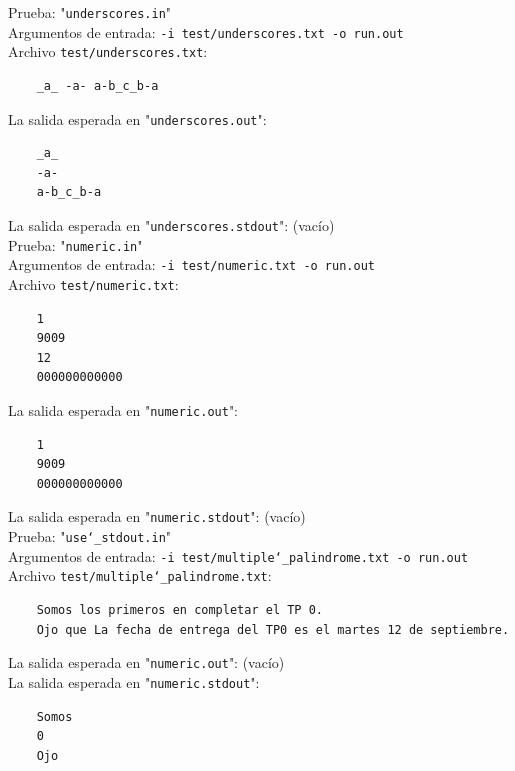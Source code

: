 \documentclass[a4paper,10pt]{article}
\begin{document}
    
    Prueba: "\texttt{underscores.in}" \\
    Argumentos de entrada: \texttt{-i test/underscores.txt -o run.out}\\
    Archivo \texttt{test/underscores.txt}: \\
    \begin{Verbatim}
    _a_ -a- a-b_c_b-a
    \end{Verbatim}
    La salida esperada en "\texttt{underscores.out}":\\
        \begin{Verbatim}
    _a_
    -a-
    a-b_c_b-a
    \end{Verbatim}
    La salida esperada en "\texttt{underscores.stdout}": (vacío)\\
    
        Prueba: "\texttt{numeric.in}" \\
    Argumentos de entrada: \texttt{-i test/numeric.txt -o run.out}\\
    Archivo \texttt{test/numeric.txt}: \\
    \begin{Verbatim}
    1
    9009
    12
    000000000000
    \end{Verbatim}
    La salida esperada en "\texttt{numeric.out}":\\
        \begin{Verbatim}
    1
    9009
    000000000000
    \end{Verbatim}
    La salida esperada en "\texttt{numeric.stdout}": (vacío)\\
    
        Prueba: "\texttt{use\char`_stdout.in}" \\
    Argumentos de entrada: \texttt{-i test/multiple\char`_palindrome.txt -o run.out}\\
    Archivo \texttt{test/multiple\char`_palindrome.txt}: \\
    \begin{Verbatim}
    Somos los primeros en completar el TP 0.
    Ojo que La fecha de entrega del TP0 es el martes 12 de septiembre.
    \end{Verbatim}
    La salida esperada en "\texttt{numeric.out}": (vacío)\\

    La salida esperada en "\texttt{numeric.stdout}": \\
            \begin{Verbatim}
    Somos
    0
    Ojo
    \end{Verbatim}
    
\end{document}

